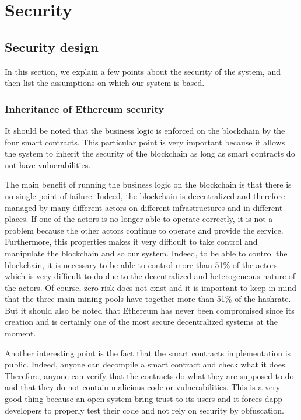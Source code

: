 \documentclass[a4paper,11pt,oneside]{report}
\begin{document}
\chapter{Security}

\section{Security design}
In this section, we explain a few points about the security of the system, and then list the assumptions on which our system is based.

\subsection{Inheritance of Ethereum security}
It should be noted that the business logic is enforced on the blockchain by the four smart contracts. This particular point is very important because it allows the system to inherit the security of the blockchain as long as smart contracts do not have vulnerabilities.

The main benefit of running the business logic on the blockchain is that there is no single point of failure. Indeed, the blockchain is decentralized and therefore managed by many different actors on different infrastructures and in different places. If one of the actors is no longer able to operate correctly, it is not a problem because the other actors continue to operate and provide the service. Furthermore, this properties makes it very difficult to take control and manipulate the blockchain and so our system. Indeed, to be able to control the blockchain, it is necessary to be able to control more than 51\% of the actors which is very difficult to do due to the decentralized and heterogeneous nature of the actors. Of course, zero risk does not exist and it is important to keep in mind that the three main mining pools have together more than 51\% of the hashrate. But it should also be noted that Ethereum has never been compromised since its creation and is certainly one of the most secure decentralized systems at the moment.

Another interesting point is the fact that the smart contracts implementation is public. Indeed, anyone can decompile a smart contract and check what it does. Therefore, anyone can verify that the contracts do what they are supposed to do and that they do not contain malicious code or vulnerabilities. This is a very good thing because an open system bring trust to its users and it forces dapp developers to properly test their code and not rely on security by obfuscation. 
\end{document}
